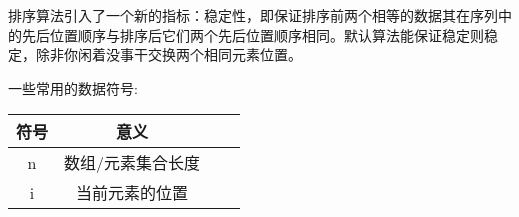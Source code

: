 排序算法引入了一个新的指标：稳定性，即保证排序前两个相等的数据其在序列中的先后位置顺序与排序后它们两个先后位置顺序相同。默认算法能保证稳定则稳定，除非你闲着没事干交换两个相同元素位置。

一些常用的数据符号:

\begin{table}[H]
    \centering
    \setlength{\tabcolsep}{4mm}
    \begin{tabular}{c|ccc}
        \toprule
        \textbf{符号} & \textbf{意义} \\
        \midrule
        n & 数组/元素集合长度 \\
        i & 当前元素的位置 \\
        \bottomrule
    \end{tabular}
\end{table}